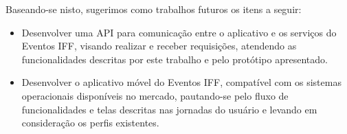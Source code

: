Baseando-se nisto, sugerimos como trabalhos futuros os itens a seguir:

\begin{itemize}
    \item Desenvolver uma API para comunicação entre o aplicativo e os serviços do Eventos IFF, visando realizar e receber requisições, atendendo as funcionalidades descritas por este trabalho e pelo protótipo apresentado.
    
    \item Desenvolver o aplicativo móvel do Eventos IFF, compatível com os sistemas operacionais disponíveis no mercado, pautando-se pelo fluxo de funcionalidades e telas descritas nas jornadas do usuário e levando em consideração os perfis existentes.
\end{itemize}